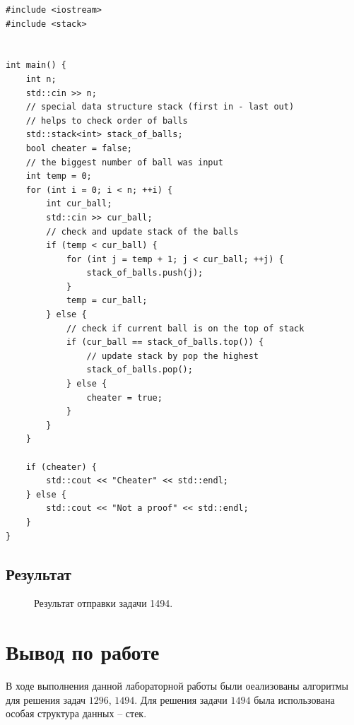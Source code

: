 \documentclass[a5paper, 10pt]{article}
\theoremstyle{definition}
\theoremstyle{plain}
\theoremstyle{remark}
\begin{document}
\begin{center}
\begin{lstlisting}[label=some-code,caption={Исходный код для 1494}]
#include <iostream>
#include <stack>


int main() {
    int n;
    std::cin >> n;
    // special data structure stack (first in - last out)
    // helps to check order of balls
    std::stack<int> stack_of_balls;
    bool cheater = false;
    // the biggest number of ball was input
    int temp = 0;
    for (int i = 0; i < n; ++i) {
        int cur_ball;
        std::cin >> cur_ball;
        // check and update stack of the balls
        if (temp < cur_ball) {
            for (int j = temp + 1; j < cur_ball; ++j) {
                stack_of_balls.push(j);
            }
            temp = cur_ball;
        } else {
            // check if current ball is on the top of stack
            if (cur_ball == stack_of_balls.top()) {
                // update stack by pop the highest
                stack_of_balls.pop();
            } else {
                cheater = true;
            }
        }
    }

    if (cheater) {
        std::cout << "Cheater" << std::endl;
    } else {
        std::cout << "Not a proof" << std::endl;
    }
}
\end{lstlisting}
\end{center}

\subsection{Результат}
\begin{figure}[h]
\caption{Результат отправки задачи 1494.}
\end{figure}




\newpage
\section{Вывод по работе}
В ходе выполнения данной лабораторной работы были оеализованы алгоритмы для решения задач $1296$, $1494$. Для решения задачи $1494$ была использована особая структура данных -- стек.
\end{document}
